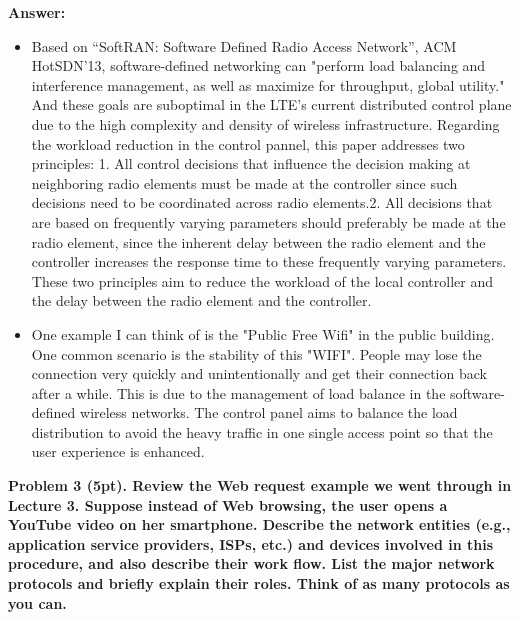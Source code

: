 \documentclass[12pt]{article}
\begin{document}
\textbf{Answer:}
\begin{itemize}
    \item Based on “SoftRAN: Software Defined Radio Access Network”, ACM HotSDN’13, software-defined networking can "perform load balancing and interference management, as well as maximize for throughput,
global utility." And these goals are suboptimal in the LTE’s current distributed control plane due to the high complexity and density of wireless infrastructure. Regarding the workload reduction in the control pannel, this paper addresses two principles: 1. All control decisions that influence the decision making
at neighboring radio elements must be made at the controller since such decisions need to be coordinated
across radio elements.2. All decisions that are based on frequently varying parameters should preferably be made at the radio element, since the inherent delay between the radio element and the controller increases the response time to these frequently varying parameters. These two principles aim to reduce the workload of the local controller and the delay between the radio element and the controller.
    \item One example I can think of is the "Public Free Wifi" in the public building. One common scenario is the stability of this "WIFI". People may lose the connection very quickly and unintentionally and get their connection back after a while. This is due to the management of load balance in the software-defined wireless networks. The control panel aims to balance the load distribution to avoid the heavy traffic in one single access point so that the user experience is enhanced. \\
\end{itemize}




\noindent \textbf{Problem 3 (5pt). Review the Web request example we went through in Lecture 3. Suppose
instead of Web browsing, the user opens a YouTube video on her smartphone. Describe the
network entities (e.g., application service providers, ISPs, etc.) and devices involved in this
procedure, and also describe their work flow. List the major network protocols and briefly
explain their roles. Think of as many protocols as you can.\\}
\end{document}
